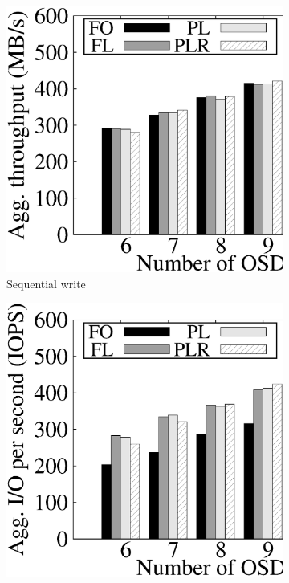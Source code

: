 \begin{figure}[t]
\centering
 \begin{subfigure}[t]{0.48\linewidth}
     \includegraphics[width=\linewidth]{charts/seq_write/eps/seq_write}
     \caption{Sequential write}
	 \label{fig:seq_write}
 \end{subfigure}
 \begin{subfigure}[t]{0.48\linewidth}
     \includegraphics[width=\linewidth]{charts/rand_write/eps/rand_write}

\end{subfigure}
\end{figure}
